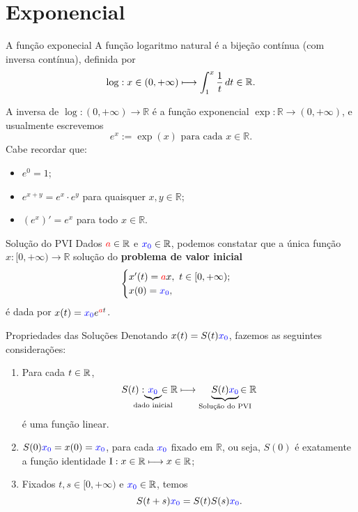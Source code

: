 \section{Exponencial}

\begin{frame}{A função exponecial}
A função {\color{blue}logaritmo natural} é a bijeção contínua (com inversa contínua), definida por
\[
\displaystyle \log : x\in (0,+\infty ) \longmapsto \int_{1}^{x}\frac{1}{t}\,dt  \in \mathbb {\mathbb{R}}.
\]

A inversa de $\log :(0,+\infty ) \longrightarrow \mathbb R$ é a função exponencial $\exp :\mathbb R \longrightarrow (0,+\infty)$, e usualmente escrevemos 
\[
\displaystyle e^{x} :=\exp(x) \text{  para cada } x\in \mathbb R.
\]
Cabe recordar que:
\begin{itemize}
\item $e^{0}=1$;
\item $e^{x+y} = e^x \cdot e^{y}$ para quaisquer $x,y\in \mathbb R$;
\item $(e^x)' = e^x$ para todo $x\in \mathbb R$. 
\end{itemize}
\end{frame}


\begin{frame}{Solução do PVI}
Dados ${\color{red}a}\in \mathbb R$ e ${\color{blue}x_0} \in \mathbb R$, podemos constatar que a única função $x:[0,+\infty) \longrightarrow \mathbb R$ solução do \textbf{problema de valor inicial}
\[
\begin{cases}
    x'(t)={\color{red}a}x,\ t\in [0,+\infty);\\
    x(0)={\color{blue}x_0},
\end{cases}
\]
é dada por $x(t)={\color{blue}x_0}e^{{\color{red}a}t}$.
\end{frame}

\begin{frame}{Propriedades das Soluções}
Denotando $x(t)=S(t){\color{blue}x_0}$, fazemos as seguintes considerações:
\begin{enumerate}[a]
\item Para cada $t\in \mathbb{R}$, 
\[
\displaystyle S(t):\hspace{-.5cm} \underbrace{\color{blue}x_0}_{\text{dado inicial}}
\hspace{-.5cm} \in \R \longmapsto \underbrace{S(t){\color{blue}x_0}}_{\text{Solução do PVI}}\hspace{-0.5cm} \in \R
\]
é uma {\color{blue}função linear}.

\item $S(0){\color{blue}x_0} = x(0)={\color{blue}x_0}$, para cada ${\color{blue}x_0}$ fixado em $\mathbb R$, ou seja, $S(0)$ é exatamente a função identidade $\operatorname{I}:x\in \mathbb{R} \longmapsto x\in \mathbb{R}$;

\item Fixados $t,s\in [0,+\infty)$ e ${\color{blue}x_0} \in \mathbb{R}$, temos
\begin{equation*}
\displaystyle S(t+s){\color{blue}x_0} = S(t) S(s){\color{blue}x_0}.
\end{equation*}
\end{enumerate}
\end{frame}

